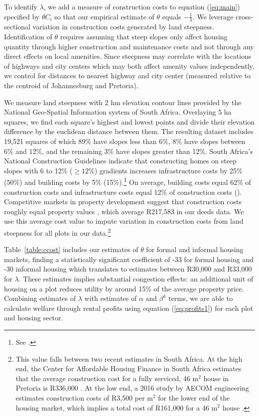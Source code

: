 \documentclass[12pt]{article}
\begin{document}
To identify $\lambda$, we add a measure of construction costs to equation (\ref{eq:main}) specified by $\theta C_i$ so that our empirical estimate of $\theta$ equals $-\frac{1}{\lambda}$.  We leverage cross-sectional variation in construction costs generated by land steepness.  Identification of $\theta$ requires assuming that steep slopes only affect housing quantity through higher construction and maintenance costs and not through any direct effects on local amenities.  Since steepness may correlate with the locations of highways and city centers which may both affect amenity values independently, we control for distances to nearest highway and city center (measured relative to the centroid of Johannesburg and Pretoria).

We measure land steepness with 2 hm elevation contour lines provided by the National Geo-Spatial Information system of South Africa.  Overlaying 5 ha squares, we find each square's highest and lowest points and divide their elevation difference by the euclidean distance between them.  The resulting dataset includes 19,521 squares of which 89\% have slopes less than 6\%, 8\% have slopes between 6\% and 12\%, and the remaining 3\% have slopes greater than 12\%.  South Africa's National Construction Guidelines indicate that constructing homes on steep slopes with 6 to 12\% ($\geq12\%$) gradients increases infrastructure costs by 25\% (50\%) and building costs by 5\% (15\%).\footnote{See \cite{redbook}.}  On average, building costs equal 62\% of construction costs and infrastructure costs equal 12\% of construction costs (\cite{cahfcosts}).  Competitive markets in property development suggest that construction costs roughly equal property values \citep{cahfcosts}, which average R217,583 in our deeds data.  We use this average cost value to impute variation in construction costs from land steepness for all plots in our data.\footnote{This value falls between two recent estimates in South Africa.  At the high end, the Center for Affordable Housing Finance in South Africa estimates that the average construction cost for a fully serviced, 46 $\text{m}^{2}$ house  in Pretoria is R336,000 \citep{cahfcosts}.  At the low end, a 2016 study by AECOM engineering estimates construction costs of R3,500 per $\text{m}^{2}$ for the lower end of the housing market, which implies a total cost of R161,000 for a 46 $\text{m}^{2}$ house \citep{aecom}.}  

Table~\ref{table:ccost} includes our estimates of $\theta$ for formal and informal housing markets, finding a statistically significant coefficient of -33 for formal housing and -30 informal housing which translates to estimates between R30,000 and R33,000 for $\lambda$.  These estimates implies substantial congestion effects: an additional unit of housing on a plot reduces utility by around 15\% of the average property price.  Combining estimates of $\lambda$ with estimates of $\alpha$ and $\beta^{k}$ terms, we are able to calculate welfare through rental profits using equation (\ref{eq:profits1}) for each plot and housing sector.
\end{document}
